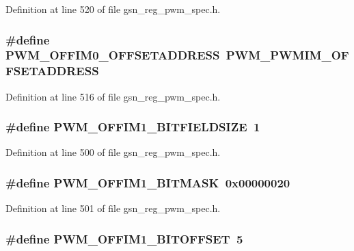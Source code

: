 Definition at line 520 of file gsn\_\-reg\_\-pwm\_\-spec.h.

\hypertarget{a00565_af94ba5e00da014775b64ab73712c90d0}{
\subsubsection[{PWM\_\-OFFIM0\_\-OFFSETADDRESS}]{\setlength{\rightskip}{0pt plus 5cm}\#define PWM\_\-OFFIM0\_\-OFFSETADDRESS~PWM\_\-PWMIM\_\-OFFSETADDRESS}}
\label{a00565_af94ba5e00da014775b64ab73712c90d0}


Definition at line 516 of file gsn\_\-reg\_\-pwm\_\-spec.h.

\hypertarget{a00565_a9495e1fb3f916dba97607f5a96d80613}{
\subsubsection[{PWM\_\-OFFIM1\_\-BITFIELDSIZE}]{\setlength{\rightskip}{0pt plus 5cm}\#define PWM\_\-OFFIM1\_\-BITFIELDSIZE~1}}
\label{a00565_a9495e1fb3f916dba97607f5a96d80613}


Definition at line 500 of file gsn\_\-reg\_\-pwm\_\-spec.h.

\hypertarget{a00565_ad66e14a243cfe054609b4768cb1095e5}{
\subsubsection[{PWM\_\-OFFIM1\_\-BITMASK}]{\setlength{\rightskip}{0pt plus 5cm}\#define PWM\_\-OFFIM1\_\-BITMASK~0x00000020}}
\label{a00565_ad66e14a243cfe054609b4768cb1095e5}


Definition at line 501 of file gsn\_\-reg\_\-pwm\_\-spec.h.

\hypertarget{a00565_a8b81fe77f2c57a36af74f6e345a2e21b}{
\subsubsection[{PWM\_\-OFFIM1\_\-BITOFFSET}]{\setlength{\rightskip}{0pt plus 5cm}\#define PWM\_\-OFFIM1\_\-BITOFFSET~5}}
\label{a00565_a8b81fe77f2c57a36af74f6e345a2e21b}


